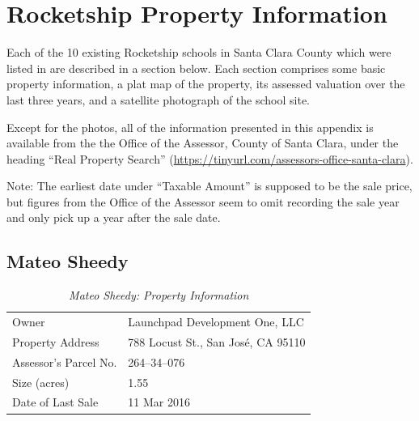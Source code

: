 
\chapter{Rocketship Property Information}\label{ch:rocketship-property-info}
\bigskip%
Each of the 10 existing Rocketship schools in Santa Clara County which were listed in  are described in a section below. Each section comprises some basic property information, a plat map of the property, its assessed valuation over the last three years, and a satellite photograph of the school site.

Except for the photos, all of the information presented in this appendix is available from the the Office of the Assessor, County of Santa Clara, under the heading ``Real Property Search'' (\url{https://tinyurl.com/assessors-office-santa-clara}).

\begin{footnote}
Note: The earliest date under ``Taxable Amount'' is supposed to be the sale price, but figures from the Office of the Assessor seem to omit recording the sale year and only pick up a year after the sale date.
\end{footnote}

\clearpage


\section{Mateo Sheedy}\label{sec:mateo-sheedy-info}
\begin{table}[htb]
  \SingleSpacing%
  \caption[Mateo Sheedy: Property Information]{\textit{Mateo Sheedy: Property Information}}\label{tab:mateo-sheedy-prop-info}
  \begin{tabular}{ll}
    \toprule
    Owner                 & Launchpad Development One, LLC \\
    Property Address      & 788 Locust St., San José, CA 95110 \\
    Assessor's Parcel No. &  264–34–076 \\
    Size (acres)          & 1.55 \\
    Date of Last Sale     & 11 Mar 2016 \\
    \bottomrule
  \end{tabular}
\end{table}

